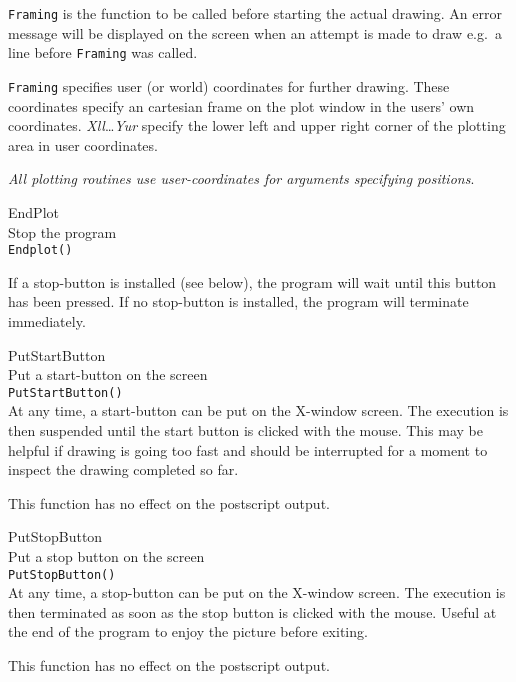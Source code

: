 {\tt Framing} is the function to be called before starting the actual 
drawing. An error message will be displayed on the screen when an attempt is
made to draw e.g.\ a line before {\tt Framing} was called.

{\tt Framing} specifies user (or world) coordinates for further drawing. 
These coordinates specify an cartesian frame on the plot window in
the users' own coordinates. {\it Xll}\ldots{\it Yur} specify the lower left
and upper right corner of the plotting area in user coordinates. 

{\em All plotting routines use user-coordinates for arguments specifying 
positions}.
 
\item{\large EndPlot} \vs{1.5mm} \\
Stop the program \vs{1.5mm}\\
{\tt Endplot()}

If a stop-button is installed (see below), the program will wait until this
button has been pressed. If no stop-button is installed, the program will
terminate immediately.

\item{\large PutStartButton} \vs{1.5mm} \\
Put a start-button on the screen \vs{1.5mm} \\ 
{\tt PutStartButton() } \\

At any time, a start-button can be put on the X-window screen. The execution
is then suspended until the start button is clicked with the mouse. 
This may be helpful if drawing is going too fast and should be interrupted
for a moment to inspect the drawing completed so far. 

This function has no effect on the postscript output. 

\item{\large PutStopButton}  \vs{1.5mm} \\
Put a stop button on the screen  \vs{1.5mm} \\ 
{\tt PutStopButton() } \\

At any time, a stop-button can be put on the X-window screen. The execution
is then terminated as soon as the stop button is clicked with the mouse. 
Useful at the end of the program to enjoy the picture before exiting. 

This function has no effect on the postscript output. 

